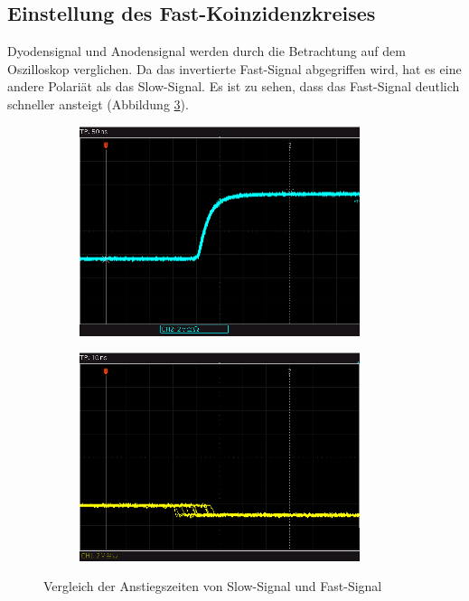 \subsection{Einstellung des Fast-Koinzidenzkreises}
Dyodensignal und Anodensignal werden durch die Betrachtung auf dem Oszilloskop verglichen. Da das invertierte Fast-Signal abgegriffen wird, hat es eine andere Polariät als das Slow-Signal. Es ist zu sehen, dass das Fast-Signal deutlich schneller ansteigt (Abbildung \ref{fig:slow_fast}).
\begin{figure}[h]
  \centering
  \begin{subfigure}[h]{0.5\textwidth}
    \centering
    \includegraphics[width=0.9\textwidth]{data/oszi/anstiegszeit_slow.png}
    \label{fig:anstiegszeit_slow}
  \end{subfigure}%
  \begin{subfigure}[h]{0.5\textwidth}
    \centering
    \includegraphics[width=0.9\textwidth]{data/oszi/anstiegszeit_fast.png}
    \label{fig:anstiegszeit_fast}
  \end{subfigure}
  \caption{Vergleich der Anstiegszeiten von Slow-Signal und Fast-Signal}
  \label{fig:slow_fast}
\end{figure}

